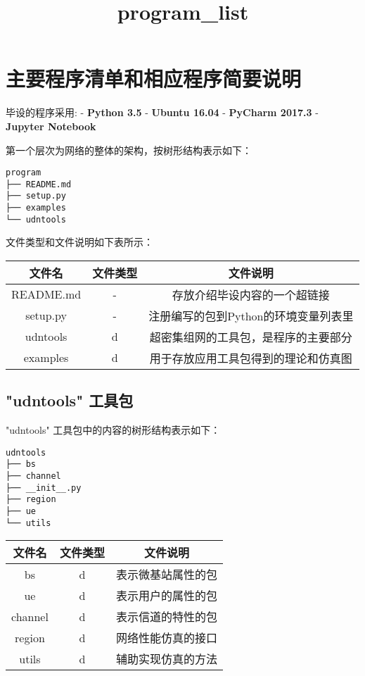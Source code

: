 \documentclass[11pt]{article}
\title{program\_list}
\begin{document}
    
    
    \maketitle
    
    

    
    \section{主要程序清单和相应程序简要说明}\label{ux4e3bux8981ux7a0bux5e8fux6e05ux5355ux548cux76f8ux5e94ux7a0bux5e8fux7b80ux8981ux8bf4ux660e}

    毕设的程序采用: - \textbf{Python 3.5} - \textbf{Ubuntu 16.04} -
\textbf{PyCharm 2017.3} - \textbf{Jupyter Notebook}

第一个层次为网络的整体的架构，按树形结构表示如下：

\begin{verbatim}
program
├── README.md
├── setup.py
├── examples
└── udntools
\end{verbatim}

文件类型和文件说明如下表所示：

\begin{longtable}[c]{@{}ccc@{}}
\toprule
文件名 & 文件类型 & 文件说明\tabularnewline
\midrule
\endhead
README.md & - & 存放介绍毕设内容的一个超链接\tabularnewline
setup.py & - & 注册编写的包到Python的环境变量列表里\tabularnewline
udntools & d & 超密集组网的工具包，是程序的主要部分\tabularnewline
examples & d & 用于存放应用工具包得到的理论和仿真图\tabularnewline
\bottomrule
\end{longtable}

    \subsection{"udntools" 工具包}\label{udntools-ux5de5ux5177ux5305}

"udntools" 工具包中的内容的树形结构表示如下：

\begin{verbatim}
udntools
├── bs
├── channel
├── __init__.py
├── region
├── ue
└── utils
\end{verbatim}

\begin{longtable}[c]{@{}ccc@{}}
\toprule
文件名 & 文件类型 & 文件说明\tabularnewline
\midrule
\endhead
bs & d & 表示微基站属性的包\tabularnewline
ue & d & 表示用户的属性的包\tabularnewline
channel & d & 表示信道的特性的包\tabularnewline
region & d & 网络性能仿真的接口\tabularnewline
utils & d & 辅助实现仿真的方法\tabularnewline
\bottomrule
\end{longtable}
\end{document}
